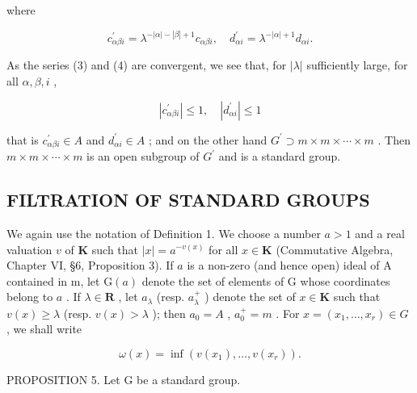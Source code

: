 where

\[
c _ {\alpha \beta i} ^ {\prime} = \lambda^ {- | \alpha | - | \beta | + 1} c _ {\alpha \beta i}, \quad d _ {\alpha i} ^ {\prime} = \lambda^ {- | \alpha | + 1} d _ {\alpha i}.
\]

As the series (3) and (4) are convergent, we see that, for \(|\lambda|\) sufficiently large, for all \(\alpha, \beta, i\) ,

\[
\left| c _ {\alpha \beta i} ^ {\prime} \right| \leqslant 1, \quad \left| d _ {\alpha i} ^ {\prime} \right| \leqslant 1
\]

that is \(c_{\alpha\beta i}^{\prime}\in A\) and \(d_{\alpha i}^{\prime}\in A\) ; and on the other hand \(G^{\prime}\supset m\times m\times\cdots\times m\) . Then \(m\times m\times\cdots\times m\) is an open subgroup of \(G^{\prime}\) and is a standard group.

\subsection{FILTRATION OF STANDARD GROUPS}

We again use the notation of Definition 1. We choose a number \(a > 1\) and a real valuation \(v\) of \(\mathbf{K}\) such that \(|x| = a^{-v(x)}\) for all \(x \in \mathbf{K}\) (Commutative Algebra, Chapter VI, §6, Proposition 3). If \(a\) is a non-zero (and hence open) ideal of A contained in m, let \(\mathrm{G}(a)\) denote the set of elements of G whose coordinates belong to \(a\) . If \(\lambda \in \mathbf{R}\) , let \(a_{\lambda}\) (resp. \(a_{\lambda}^{+}\) ) denote the set of \(x \in \mathbf{K}\) such that \(v(x) \geqslant \lambda\) (resp. \(v(x) > \lambda\) ); then \(a_0 = A\) , \(a_0^+ = m\) . For \(x = (x_1, \ldots, x_r) \in G\) , we shall write

\[
\omega (x) = \inf (v (x _ {1}), \dots , v (x _ {r})).\tag{5}
\]

PROPOSITION 5. Let G be a standard group.

